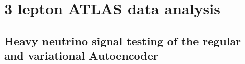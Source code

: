 \section{3 lepton ATLAS data analysis}

\subsection*{Heavy neutrino signal testing of the regular and variational Autoencoder}